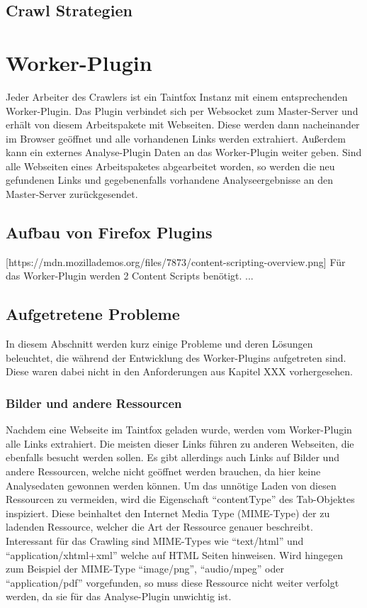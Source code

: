 \subsection{Crawl Strategien}


\section{Worker-Plugin}
Jeder Arbeiter des Crawlers ist ein Taintfox Instanz mit einem entsprechenden Worker-Plugin. Das Plugin verbindet sich per Websocket zum Master-Server und erhält von diesem Arbeitspakete mit Webseiten. Diese werden dann nacheinander im Browser geöffnet und alle vorhandenen Links werden extrahiert. Außerdem kann ein externes Analyse-Plugin Daten an das Worker-Plugin weiter geben. Sind alle Webseiten eines Arbeitspaketes abgearbeitet worden, so werden die neu gefundenen Links und gegebenenfalls vorhandene Analyseergebnisse an den Master-Server zurückgesendet.
\subsection{Aufbau von Firefox Plugins}
 [https://mdn.mozillademos.org/files/7873/content-scripting-overview.png]
Für das Worker-Plugin werden 2 Content Scripts benötigt. ...
\subsection{Aufgetretene Probleme}
In diesem Abschnitt werden kurz einige Probleme und deren Lösungen beleuchtet, die während der Entwicklung des Worker-Plugins aufgetreten sind. Diese waren dabei nicht in den Anforderungen aus Kapitel XXX vorhergesehen.
\subsubsection{Bilder und andere Ressourcen}
Nachdem eine Webseite im Taintfox geladen wurde, werden vom Worker-Plugin alle Links extrahiert. Die meisten dieser Links führen zu anderen Webseiten, die ebenfalls besucht werden sollen. Es gibt allerdings auch Links auf Bilder und andere Ressourcen, welche nicht geöffnet werden brauchen, da hier keine Analysedaten gewonnen werden können. Um das unnötige Laden von diesen Ressourcen zu vermeiden, wird die Eigenschaft \enquote{contentType} des Tab-Objektes inspiziert. Diese beinhaltet den Internet Media Type (MIME-Type) der zu ladenden Ressource, welcher die Art der Ressource genauer beschreibt. Interessant für das Crawling sind MIME-Types wie \enquote{text/html} und \enquote{application/xhtml+xml} welche auf HTML Seiten hinweisen. Wird hingegen zum Beispiel der MIME-Type \enquote{image/png}, \enquote{audio/mpeg} oder \enquote{application/pdf} vorgefunden, so muss diese Ressource nicht weiter verfolgt werden, da sie für das Analyse-Plugin unwichtig ist. 
